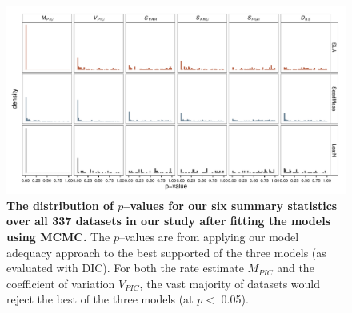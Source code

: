\documentclass[a4paper,12pt]{article}
\begin{document}
\begin{figure}[p]
  \centering
  \includegraphics[angle=90, origin=c, scale=0.85]{figs/pval-hist-bayes}
  \caption{\textbf{The distribution of $p$--values for our six summary statistics over all 337 datasets in our study after fitting the models using MCMC.} The $p$--values are from applying our model adequacy approach to the best supported of the three models (as evaluated with DIC). For both the rate estimate $M_{PIC}$ and the coefficient of variation $V_{PIC}$, the vast majority of datasets would reject the best of the three models (at $p<$ 0.05).}
  \label{fig:supp-pvalues}
\end{figure}
\end{document}
